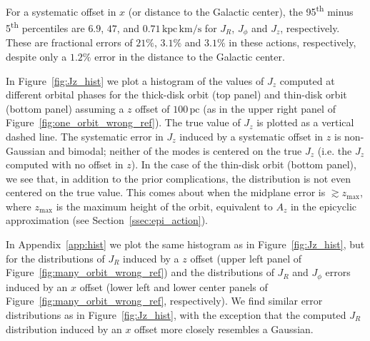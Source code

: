 \documentclass[twocolumn]{aastex62}
\newcommand{\pc}{\text{pc}}
\newcommand{\kms}{\text{km}/\text{s}}
\newcommand{\actunit}{\text{kpc}\,\kms}
\begin{document}
For a systematic offset in $x$ (or distance to the Galactic center), the
95\textsuperscript{th} minus 5\textsuperscript{th} percentiles are $6.9$,
$47$, and $0.71\,\actunit$ for $J_R$, $J_{\phi}$ and $J_z$, respectively.
These are fractional errors of $21\%$, $3.1\%$ and $3.1\%$ in these actions, respectively, despite only a $1.2\%$ error in the distance to the Galactic center.

In Figure~\ref{fig:Jz_hist} we plot a histogram of the values of
$J_z$ computed at different orbital phases for the thick-disk orbit (top panel) and thin-disk orbit (bottom panel)
assuming a $z$ offset of $100\,\pc$ (as in the upper right panel of
Figure~\ref{fig:one_orbit_wrong_ref}). The true value of $J_z$ is plotted as a
vertical dashed line. The systematic error in $J_z$ induced by a
systematic offset in $z$ is non-Gaussian and bimodal; neither of the modes is centered on the true $J_z$ (i.e. the $J_z$ computed with no offset in $z$). In the case of the thin-disk orbit
(bottom panel), we see that, in addition to the prior complications, the
distribution is not even centered on the true value. This comes about when the midplane
error is $\gtrsim z_{\text{max}}$, where $z_{\text{max}}$ is the maximum
height of the orbit, equivalent to $A_z$ in the epicyclic approximation (see
Section~\ref{ssec:epi_action}).

In Appendix~\ref{app:hist} we plot the same histogram as in
Figure~\ref{fig:Jz_hist}, but for the distributions of $J_R$ induced
by a $z$ offset (upper left panel of Figure~\ref{fig:many_orbit_wrong_ref})
and the distributions of $J_R$ and $J_{\phi}$ errors induced by an
$x$ offset (lower left and lower center panels of
Figure~\ref{fig:many_orbit_wrong_ref}, respectively). We find similar error
distributions as in Figure~\ref{fig:Jz_hist}, with the exception that the
computed $J_R$ distribution induced by an $x$ offset more closely resembles a
Gaussian.
\end{document}
